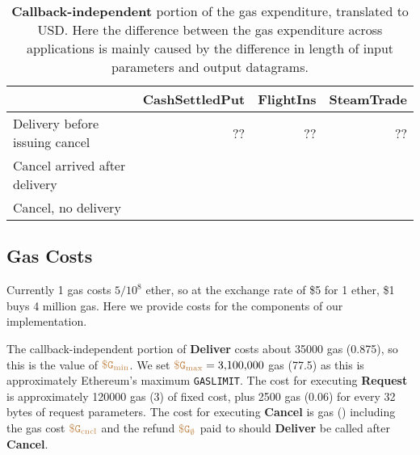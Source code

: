 \begin{table*}[ht]
\centering
\begin{tabular}{lr|r|r}
\toprule
& \multicolumn{1}{c|}{\sf CashSettledPut} &
  \multicolumn{1}{c|}{\sf FlightIns} &
  \multicolumn{1}{c}{\sf SteamTrade} \\
\midrule
Delivery before issuing cancel & ?? & ?? & ?? \\ 
Cancel arrived after delivery & & & \\ 
Cancel, no delivery & & & \\ 
\bottomrule
\end{tabular}
\caption{{\bf Callback-independent} portion of the gas expenditure, translated
to USD.  Here the difference between the gas expenditure across applications
is mainly caused 
by the difference in length of input parameters and output datagrams.
}
\label{tab:eval_gas}
\end{table*}



\subsection{Gas Costs}
Currently 1 gas costs $5 / 10^8$ ether, so at the exchange rate of \$5 for 1 ether, \$1 buys 4 million gas.
Here we provide costs for the components of our implementation.

The callback-independent portion of {\bf Deliver} costs about \num[group-separator={,}]{35000} gas (0.875\textcent), so this is the value of $\constgasmin$.
We set $\constgasmax = \num[group-separator={,}]{3100000}$ gas (77.5\textcent) as this is approximately Ethereum's maximum {\tt GASLIMIT}.
The cost for executing {\bf Request} is approximately \num[group-separator={,}]{120000} gas (3\textcent) of fixed cost, 
plus \num[group-separator={,}]{2500} gas (0.06\textcent) for every 32 bytes of request parameters.
The cost for executing {\bf Cancel} is  gas (\textcent)
including the gas cost $\constgasinvokecancel$ and the refund $\constgascancel$ paid to \tcs should {\bf Deliver} be called after {\bf Cancel}.




